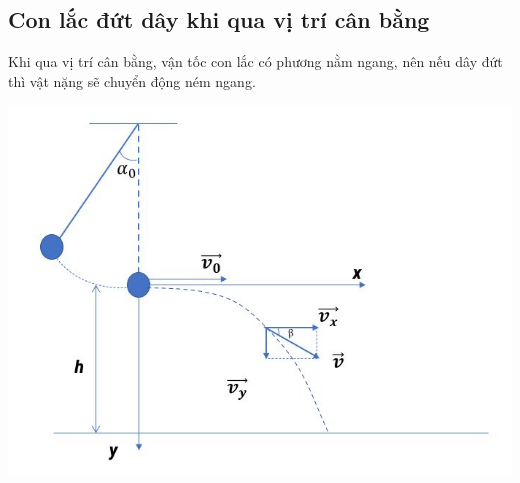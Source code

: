 \subsection{Con lắc đứt dây khi qua vị trí cân bằng}
Khi qua vị trí cân bằng, vận tốc con lắc có phương nằm ngang, nên nếu dây đứt thì vật nặng sẽ chuyển động ném ngang. 
\begin{center}
	\includegraphics[scale=0.6]{../figs/VN12-PH-04-A-003-2-V2-2.JPG}
\end{center}
